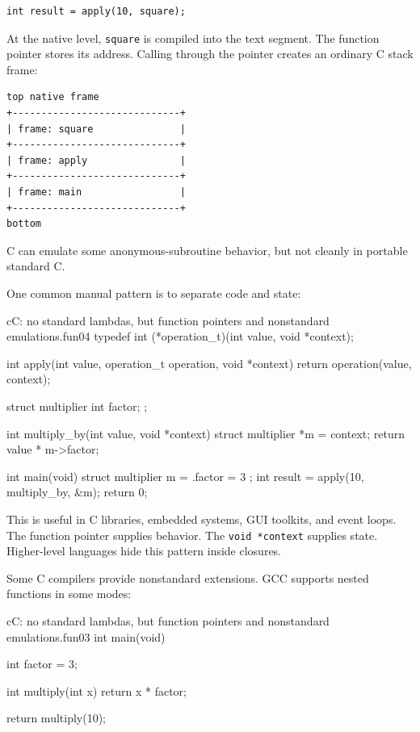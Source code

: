 \begin{verbatim}
int result = apply(10, square);
\end{verbatim}

At the native level, \texttt{square} is compiled into the text segment. The function pointer stores its address. Calling through the pointer creates an ordinary C stack frame:

\begin{verbatim}
top native frame
+-----------------------------+
| frame: square               |
+-----------------------------+
| frame: apply                |
+-----------------------------+
| frame: main                 |
+-----------------------------+
bottom
\end{verbatim}

C can emulate some anonymous-subroutine behavior, but not cleanly in portable standard C.

One common manual pattern is to separate code and state:

\begin{codebox}[]{c}{C: no standard lambdas, but function pointers and nonstandard emulations.}{fun04}
typedef int (*operation_t)(int value, void *context);

int apply(int value, operation_t operation, void *context) {
    return operation(value, context);
}

struct multiplier {
    int factor;
};

int multiply_by(int value, void *context) {
    struct multiplier *m = context;
    return value * m->factor;
}

int main(void) {
    struct multiplier m = { .factor = 3 };
    int result = apply(10, multiply_by, &m);
    return 0;
}
\end{codebox}


This is useful in C libraries, embedded systems, GUI toolkits, and event loops. The function pointer supplies behavior. The \texttt{void *context} supplies state. Higher-level languages hide this pattern inside closures.

Some C compilers provide nonstandard extensions. GCC supports nested functions in some modes:

\begin{codebox}[]{c}{C: no standard lambdas, but function pointers and nonstandard emulations.}{fun03}
int main(void) {
    int factor = 3;

    int multiply(int x) {
        return x * factor;
    }

    return multiply(10);
}
\end{codebox}


